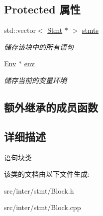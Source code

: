 \subsection*{Protected 属性}
\begin{DoxyCompactItemize}
\item 
std\+::vector$<$ \hyperlink{class_stmt}{Stmt} $\ast$ $>$ \hyperlink{class_block_a88f627f956bdc80d9d697f0755130d34}{stmts}\hypertarget{class_block_a88f627f956bdc80d9d697f0755130d34}{}\label{class_block_a88f627f956bdc80d9d697f0755130d34}

\begin{DoxyCompactList}\small\item\em 储存该块中的所有语句 \end{DoxyCompactList}\item 
\hyperlink{class_env}{Env} $\ast$ \hyperlink{class_block_a85617f1e8f9f4b998e9b1ebc4c3b37c4}{env}\hypertarget{class_block_a85617f1e8f9f4b998e9b1ebc4c3b37c4}{}\label{class_block_a85617f1e8f9f4b998e9b1ebc4c3b37c4}

\begin{DoxyCompactList}\small\item\em 储存当前的变量环境 \end{DoxyCompactList}\end{DoxyCompactItemize}
\subsection*{额外继承的成员函数}


\subsection{详细描述}
语句块类 

该类的文档由以下文件生成\+:\begin{DoxyCompactItemize}
\item 
src/inter/stmt/Block.\+h\item 
src/inter/stmt/Block.\+cpp\end{DoxyCompactItemize}
